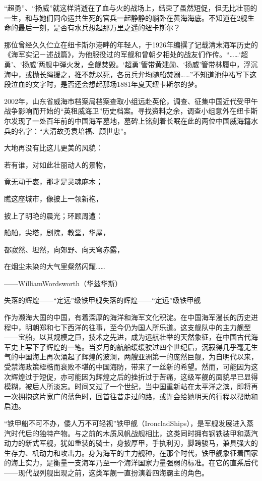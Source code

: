 \documentclass[12pt,UTF8]{ctexbook}
\begin{document}
“超勇”、“扬威”就这样消逝在了血与火的战场上，结束了虽然短促，但无比壮丽的一生，和与她们同命运共生死的官兵一起静静的躺卧在黄海海底。不知道在2舰生命的最后一刻，是否有水兵想起那万里之遥的纽卡斯尔？

那位曾经久久伫立在纽卡斯尔港畔的年轻人，于1926年编撰了记载清末海军历史的《海军实记－述战篇》，为他服役过的军舰和曾朝夕相处的战友们作传。“……‘超勇’、‘扬威’两舰中弹火发，全舰焚毁。‘超勇’管带黄建勋、‘扬威’管带林履中，浮沉海中，或抛长绳援之，推不就以死，各员兵弁均随船焚溺……”不知道池仲祐写下这段泣血的文字时，是否还会想起那场1881年夏天纽卡斯尔的梦。

2002年，山东省威海市档案局档案查取小组远赴英伦，调查、征集中国近代受甲午战争影响而开始的“英租威海卫”历史档案。寻找资料之余，调查小组意外在纽卡斯尔发现了一处百年前的中国海军墓地，墓碑上铭刻着长眠在此的两位中国威海籍水兵的名字：“大清故勇袁培福、顾世忠”。

大地再没有比这儿更美的风貌：

若有谁，对如此壮丽动人的景物，

竟无动于衷，那才是灵魂麻木；

瞧这座城市，像披上一领新袍，

披上了明艳的晨光；环顾周遭：

船舶，尖塔，剧院，教堂，华屋，

都寂然、坦然，向郊野、向天穹赤露，

在烟尘未染的大气里粲然闪耀……

——WilliamWordsworth（华兹华斯）

失落的辉煌——“定远”级铁甲舰失落的辉煌——“定远”级铁甲舰

作为濒海大国的中国，有着深厚的海洋和海军文化积淀。在中国海军漫长的历史进程中，明朝郑和七下西洋的往事，至今仍为国人所乐道。这支舰队中的主力舰型——宝船，以其规模之巨，技术之先进，成为远航壮举的天然象征，在中国古代海军史上写下了辉煌的一笔。当岁月的航船缓缓驶过四个世纪后，沉寂得几乎毫无生气的中国海上再次涌起了辉煌的波澜，两艘亚洲第一的庞然巨舰，为自明代以来，受禁海政策桎梏而衰败不堪的中国海防，带来了一丝新的希望。然而，可能因为这次辉煌过于短促，亦可能因为辉煌之后的挫折过于苦痛，这级军舰的面貌早已显得模糊，被后人所淡忘。时间又过了一个世纪，当中国重新站在太平洋之滨，即将再一次拥抱这片宽广的蓝色时，回首往昔走过的路，或许会给她明天的行程以帮助和启迪。

“铁甲船不可不办，倭人万不可轻视”铁甲舰（IroncladShips），是军舰发展进入蒸汽时代后的独特产物。与之前的木质风帆战舰相比，这类同时拥有钢铁装甲和蒸汽动力的新式军舰，犹如重装的骑士，身披厚甲，手执利刃，脚跨骏马，兼具强大的生存力、机动力和攻击力。身为海军的主力舰种，在那个时代，铁甲舰象征着国家的海上实力，是衡量一支海军乃至一个海洋国家力量强弱的标准。在它的直系后代——现代战列舰出现之前，这类军舰一直扮演着四海霸主的角色。
\end{document}
